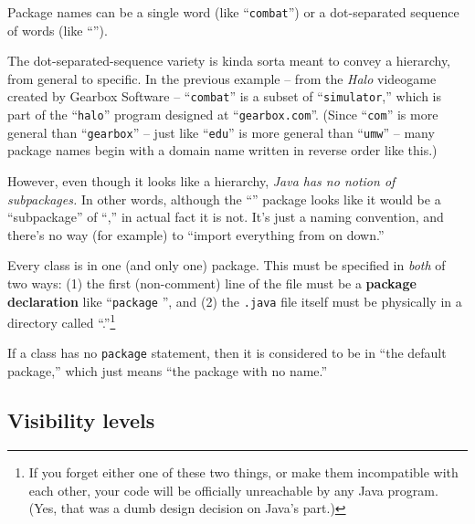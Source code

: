\begin{compactenum}

\item Package names can be a single word (like ``\texttt{combat}'') or a
dot-separated sequence of words (like
``'').

\item The dot-separated-sequence variety is kinda sorta meant to convey a
hierarchy, from general to specific. In the previous example -- from the
\textit{Halo} videogame created by Gearbox Software -- ``\texttt{combat}'' is a
subset of ``\texttt{simulator},'' which is part of the ``\texttt{halo}''
program designed at ``\texttt{gearbox.com}''. (Since ``\texttt{com}'' is more
general than ``\texttt{gearbox}'' -- just like ``\texttt{edu}'' is more general
than ``\texttt{umw}'' -- many package names begin with a domain name written in
reverse order like this.)

\item However, even though it looks like a hierarchy, \textit{Java has no
notion of subpackages.} In other words, although the
``'' package looks like it would be a
``subpackage'' of ``,'' in actual fact it is not. It's
just a naming convention, and there's no way (for example) to ``import
everything from  on down.''

\item Every class is in one (and only one) package. This must be specified in
\textit{both} of two ways: (1) the first (non-comment) line of the file must be
a \textbf{package declaration} like ``\texttt{package}
'', and (2) the \texttt{.java} file
itself must be physically in a directory called
``.''\footnote{If you forget either one
of these two things, or make them incompatible with each other, your code will
be officially unreachable by any Java program. (Yes, that was a dumb design
decision on Java's part.)}

\item If a class has no \texttt{package} statement, then it is considered to be
in ``the default package,'' which just means ``the package with no name.''
\end{compactenum}

\subsection{Visibility levels}

